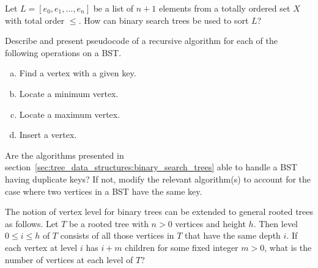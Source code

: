 \begin{problem}
\item Let $L = [e_0, e_1, \dots, e_n]$ be a list of $n + 1$ elements
  from a totally ordered set $X$ with total order $\leq$. How can
  binary search trees be used to sort $L$?

\item Describe and present pseudocode of a recursive algorithm for
  each of the following operations on a BST.
  \begin{enumerate}[(a)]
  \item Find a vertex with a given key.

  \item Locate a minimum vertex.

  \item Locate a maximum vertex.

  \item Insert a vertex.
  \end{enumerate}

\item Are the algorithms presented in
  section~\ref{sec:tree_data_structures:binary_search_trees} able to
  handle a BST having duplicate keys? If not, modify the relevant
  algorithm(s) to account for the case where two vertices in a BST
  have the same key.

\item The notion of vertex level for binary trees can be extended to
  general rooted trees as follows. Let $T$ be a rooted tree with
  $n > 0$ vertices and height $h$. Then level
  $0 \leq i \leq h$ of $T$ consists of all those vertices in $T$ that
  have the same depth $i$. If each vertex at level $i$ has $i + m$
  children for some fixed integer $m > 0$, what is the number of
  vertices at each level of $T$?
\end{problem}
